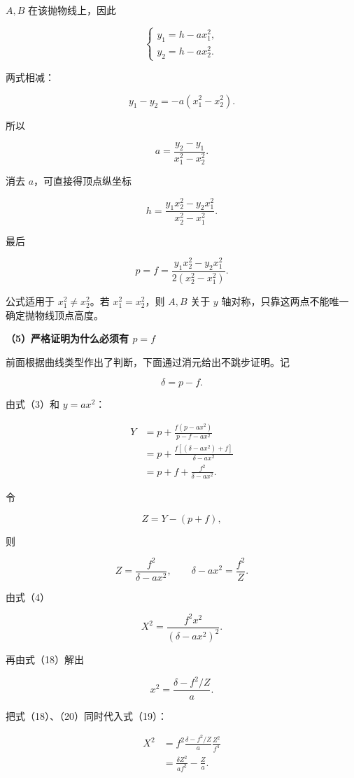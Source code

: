\documentclass[12pt,a4paper,UTF8]{ctexart}
\begin{document}
\(A,B\) 在该抛物线上，因此

\[
\begin{cases}
y_1=h-ax_1^2,\\
y_2=h-ax_2^2.
\end{cases}\tag{13}
\]

两式相减：

\[
y_1-y_2=-a(x_1^2-x_2^2).
\]

所以

\[
a=\frac{y_2-y_1}{x_1^2-x_2^2}.\tag{14}
\]

消去 \(a\)，可直接得顶点纵坐标

\[
\boxed{
h=\frac{y_1x_2^2-y_2x_1^2}{x_2^2-x_1^2}
}.\tag{15}
\]

最后

\[
\boxed{
p=f=\frac{y_1x_2^2-y_2x_1^2}
{2(x_2^2-x_1^2)}
}.\tag{16}
\]

公式适用于 \(x_1^2\ne x_2^2\)。若 \(x_1^2=x_2^2\)，则 \(A,B\) 关于 \(y\)
轴对称，只靠这两点不能唯一确定抛物线顶点高度。

\textbf{（5）严格证明为什么必须有 \(p=f\)}

前面根据曲线类型作出了判断，下面通过消元给出不跳步证明。记

\[
\delta=p-f.
\]

由式（3）和 \(y=ax^2\)：

\[
\begin{aligned}
Y
&=p+\frac{f(p-ax^2)}{p-f-ax^2}\\
&=p+\frac{f[(\delta-ax^2)+f]}{\delta-ax^2}\\
&=p+f+\frac{f^2}{\delta-ax^2}.
\end{aligned}
\tag{17}
\]

令

\[
Z=Y-(p+f),
\]

则

\[
Z=\frac{f^2}{\delta-ax^2},
\qquad
\delta-ax^2=\frac{f^2}{Z}.
\tag{18}
\]

由式（4）

\[
X^2=\frac{f^2x^2}{(\delta-ax^2)^2}.
\tag{19}
\]

再由式（18）解出

\[
x^2=\frac{\delta-f^2/Z}{a}.
\tag{20}
\]

把式（18）、（20）同时代入式（19）：

\[
\begin{aligned}
X^2
&=f^2\frac{\delta-f^2/Z}{a}
\frac{Z^2}{f^4}\\
&=\frac{\delta Z^2}{af^2}-\frac Za.
\end{aligned}
\]
\end{document}
